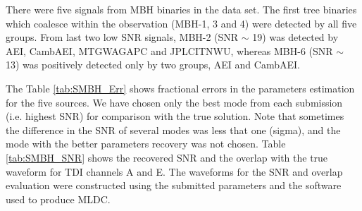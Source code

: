 \documentclass{iopart}
\begin{document}
There were five signals from MBH binaries in the data set. The first tree binaries which coalesce within the 
observation (MBH-1, 3 and 4) were detected by all five groups. From last two low SNR signals, MBH-2 (SNR $\sim$ 19) was detected by AEI, CambAEI, MTGWAGAPC and JPLCITNWU, whereas MBH-6 (SNR $\sim$ 13) was positively detected only by two groups, AEI and CambAEI.  

The Table \ref{tab:SMBH_Err} shows fractional errors in the parameters estimation for the five sources. We have chosen only the best mode from each submission (i.e. highest SNR) for comparison with the true solution. Note that 
sometimes the difference in the SNR of several modes was less that one (sigma), and the mode with the better 
parameters recovery was not chosen.
Table \ref{tab:SMBH_SNR} shows the recovered SNR and the overlap with  the true waveform for TDI channels A and E. The waveforms for the SNR and overlap evaluation were constructed using the submitted parameters and the software
used to produce MLDC.
\end{document}
